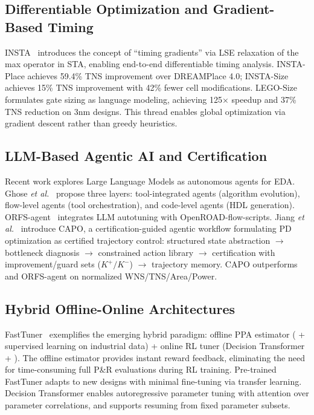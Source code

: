 \documentclass[10pt,conference]{IEEEtran}
\newcommand{\etal}{\textit{et al.}}
\newcommand{\PPO}{\text{PPO}}
\newcommand{\GNN}{\text{GNN}}
\newcommand{\BO}{\text{BO}}
\begin{document}
\subsection{Differentiable Optimization and Gradient-Based Timing}
\label{sec:diff_opt}

INSTA~\cite{lu2023insta} introduces the concept of ``timing gradients'' via LSE relaxation of the max operator in STA, enabling end-to-end differentiable timing analysis. INSTA-Place achieves 59.4\% TNS improvement over DREAMPlace 4.0; INSTA-Size achieves 15\% TNS improvement with 42\% fewer cell modifications. LEGO-Size formulates gate sizing as language modeling, achieving 125$\times$ speedup and 37\% TNS reduction on 3nm designs. This thread enables global optimization via gradient descent rather than greedy heuristics.

\subsection{LLM-Based Agentic AI and Certification}
\label{sec:llm_agentic}

Recent work explores Large Language Models as autonomous agents for EDA. Ghose \etal~\cite{ghose2026agentic} propose three layers: tool-integrated agents (algorithm evolution), flow-level agents (tool orchestration), and code-level agents (HDL generation). ORFS-agent~\cite{ghose2026agentic} integrates LLM autotuning with OpenROAD-flow-scripts. Jiang \etal~\cite{jiang2026capo} introduce CAPO, a certification-guided agentic workflow formulating PD optimization as certified trajectory control: structured state abstraction $\rightarrow$ bottleneck diagnosis $\rightarrow$ constrained action library $\rightarrow$ certification with improvement/guard sets ($K^+/K^-$) $\rightarrow$ trajectory memory. CAPO outperforms \BO{} and ORFS-agent on normalized WNS/TNS/Area/Power.

\subsection{Hybrid Offline-Online Architectures}
\label{sec:hybrid}

FastTuner~\cite{hsiao2026fasttuner} exemplifies the emerging hybrid paradigm: offline PPA estimator (\GNN{} + supervised learning on industrial data) + online RL tuner (Decision Transformer + \PPO{}). The offline estimator provides instant reward feedback, eliminating the need for time-consuming full P\&R evaluations during RL training. Pre-trained FastTuner adapts to new designs with minimal fine-tuning via \GNN{} transfer learning. Decision Transformer enables autoregressive parameter tuning with attention over parameter correlations, and supports resuming from fixed parameter subsets.
\end{document}
